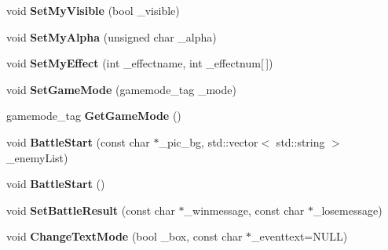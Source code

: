 \begin{DoxyCompactItemize}
\item 
void {\bfseries Set\+My\+Visible} (bool \+\_\+visible)\hypertarget{class_c_field_ab34bc052be353dea0c928dd8adc7c957}{}\label{class_c_field_ab34bc052be353dea0c928dd8adc7c957}

\item 
void {\bfseries Set\+My\+Alpha} (unsigned char \+\_\+alpha)\hypertarget{class_c_field_ae02a68969dbd2520532253c14d9dd793}{}\label{class_c_field_ae02a68969dbd2520532253c14d9dd793}

\item 
void {\bfseries Set\+My\+Effect} (int \+\_\+effectname, int \+\_\+effectnum\mbox{[}$\,$\mbox{]})\hypertarget{class_c_field_a55706b18f51a664478f524bb36907d0a}{}\label{class_c_field_a55706b18f51a664478f524bb36907d0a}

\item 
void {\bfseries Set\+Game\+Mode} (gamemode\+\_\+tag \+\_\+mode)\hypertarget{class_c_field_ae07b7753fb0ae9413bf58be56fb723e7}{}\label{class_c_field_ae07b7753fb0ae9413bf58be56fb723e7}

\item 
gamemode\+\_\+tag {\bfseries Get\+Game\+Mode} ()\hypertarget{class_c_field_ab7835715d9a6e145d4d20cecb4beecaa}{}\label{class_c_field_ab7835715d9a6e145d4d20cecb4beecaa}

\item 
void {\bfseries Battle\+Start} (const char $\ast$\+\_\+pic\+\_\+bg, std\+::vector$<$ std\+::string $>$ \+\_\+enemy\+List)\hypertarget{class_c_field_aa9f2875d5175502c8d49a2455a462cb4}{}\label{class_c_field_aa9f2875d5175502c8d49a2455a462cb4}

\item 
void {\bfseries Battle\+Start} ()\hypertarget{class_c_field_aa22cd2ea834f50802329e3f4035c96d4}{}\label{class_c_field_aa22cd2ea834f50802329e3f4035c96d4}

\item 
void {\bfseries Set\+Battle\+Result} (const char $\ast$\+\_\+winmessage, const char $\ast$\+\_\+losemessage)\hypertarget{class_c_field_a0038d96053d468931a48ffe0f1447798}{}\label{class_c_field_a0038d96053d468931a48ffe0f1447798}

\item 
void {\bfseries Change\+Text\+Mode} (bool \+\_\+box, const char $\ast$\+\_\+eventtext=N\+U\+LL)\hypertarget{class_c_field_a1c495864a16b1546016e0e3c9abdeec8}{}\label{class_c_field_a1c495864a16b1546016e0e3c9abdeec8}

\end{DoxyCompactItemize}
